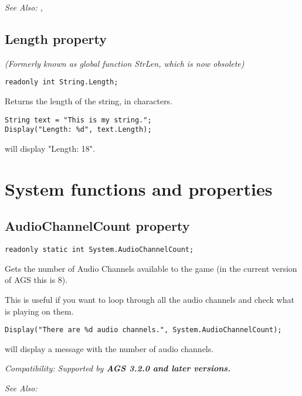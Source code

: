 \it{See Also:} ,


\subsection{Length property}\label{String.Length}%

\it{(Formerly known as global function StrLen, which is now obsolete)}

\begin{verbatim}
readonly int String.Length;
\end{verbatim}
Returns the length of the string, in characters.

\begin{verbatim}
String text = "This is my string.";
Display("Length: %d", text.Length);
\end{verbatim}
will display "Length: 18".



\section{System functions and properties}%


\subsection{AudioChannelCount property}\label{System.AudioChannelCount}%

\begin{verbatim}
readonly static int System.AudioChannelCount;
\end{verbatim}
Gets the number of Audio Channels available to the game (in the current version of AGS this is 8).

This is useful if you want to loop through all the audio channels and check what is playing on them.

\begin{verbatim}
Display("There are %d audio channels.", System.AudioChannelCount);
\end{verbatim}
will display a message with the number of audio channels.

\it{Compatibility:} Supported by \bf{AGS 3.2.0} and later versions.

\it{See Also:} 


